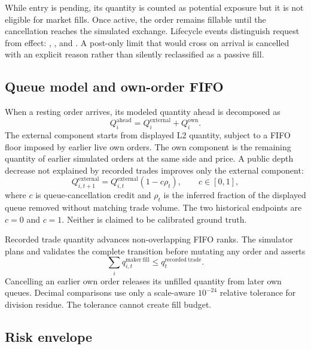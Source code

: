 While entry is pending, its quantity is counted as potential exposure but it is
not eligible for market fills. Once active, the order remains fillable until
the cancellation reaches the simulated exchange. Lifecycle events distinguish
request from effect:
, , and . A
post-only limit that would cross on arrival is cancelled with an explicit
reason rather than silently reclassified as a passive fill.

\subsection{Queue model and own-order FIFO}

When a resting order arrives, its modeled quantity ahead is decomposed as
\begin{equation}
  Q^{\mathrm{ahead}}_i = Q^{\mathrm{external}}_i + Q^{\mathrm{own}}_i.
\end{equation}
The external component starts from displayed L2 quantity, subject to a FIFO
floor imposed by earlier live own orders. The own component is the remaining
quantity of earlier simulated orders at the same side and price. A public depth
decrease not explained by recorded trades improves only the external component:
\begin{equation}
  Q^{\mathrm{external}}_{i,t+1}
  = Q^{\mathrm{external}}_{i,t}\left(1-c\rho_t\right),
  \qquad c\in[0,1],
\end{equation}
where $c$ is queue-cancellation credit and $\rho_t$ is the inferred fraction of
the displayed queue removed without matching trade volume. The two historical
endpoints are $c=0$ and $c=1$. Neither is claimed to be calibrated ground truth.

Recorded trade quantity advances non-overlapping FIFO ranks. The simulator
plans and validates the complete transition before mutating any order and
asserts
\begin{equation}
  \sum_i q^{\mathrm{maker\ fill}}_{i,t}
  \le q^{\mathrm{recorded\ trade}}_t.
\end{equation}
Cancelling an earlier own order releases its unfilled quantity from later own
queues. Decimal comparisons use only a scale-aware $10^{-24}$ relative
tolerance for division residue. The tolerance cannot create fill budget.

\subsection{Risk envelope}

